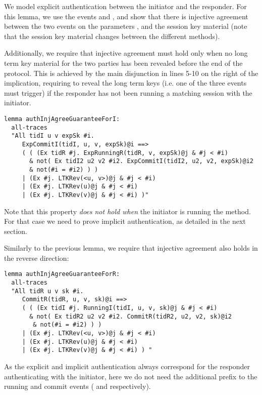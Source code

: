 We model explicit authentication between the initiator and the
responder.
%
For this lemma, we use the events  and
, and show that there is injective agreement
between the two events on the parameters ,
 and the session key material  (note
that the session key material changes between the different \mEdhoc{}
methods).

Additionally, we require that injective agreement must hold only when
no long term key material for the two parties has been revealed before
the end of the protocol.
%
This is achieved by the main disjunction in lines 5-10 on the right of
the implication, requiring to reveal the long term keys (i.e. one of
the three  events must trigger) if the responder has
not been running a matching session with the initiator.

\begin{lstlisting}
lemma authInjAgreeGuaranteeForI:
  all-traces
  "All tidI u v expSk #i.
     ExpCommitI(tidI, u, v, expSk)@i ==>
     ( ( (Ex tidR #j. ExpRunningR(tidR, v, expSk)@j & #j < #i)
       & not( Ex tidI2 u2 v2 #i2. ExpCommitI(tidI2, u2, v2, expSk)@i2
       & not(#i = #i2) ) )
     | (Ex #j. LTKRev(<u, v>)@j & #j < #i)
     | (Ex #j. LTKRev(u)@j & #j < #i)
     | (Ex #j. LTKRev(v)@j & #j < #i) )"
\end{lstlisting}

Note that this property \emph{does not hold when} the initiator is
running the \mStat{} method.
%
For that case we need to prove implicit authentication, as detailed in
the next section.

Similarly to the previous lemma, we require that injective agreement also holds
in the reverse direction:

\begin{lstlisting}
lemma authInjAgreeGuaranteeForR:
  all-traces
  "All tidR u v sk #i.
     CommitR(tidR, u, v, sk)@i ==>
     ( ( (Ex tidI #j. RunningI(tidI, u, v, sk)@j & #j < #i)
       & not( Ex tidR2 u2 v2 #i2. CommitR(tidR2, u2, v2, sk)@i2
        & not(#i = #i2) ) )
     | (Ex #j. LTKRev(<u, v>)@j & #j < #i)
     | (Ex #j. LTKRev(u)@j & #j < #i)
     | (Ex #j. LTKRev(v)@j & #j < #i) ) "
\end{lstlisting}

As the explicit and implicit authentication always correspond for the
responder authenticating with the initiator, here we do not need the
additional  prefix to the running and commit events
( and  respectively).

